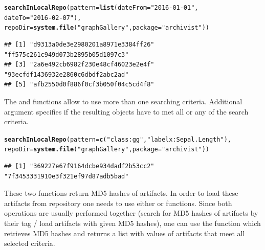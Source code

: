 \documentclass[nojss]{jss}\usepackage[]{graphicx}\usepackage[]{color}
\makeatletter
\newcommand{\hlstr}[1]{\textcolor[rgb]{0.192,0.494,0.8}{#1}}%
\newcommand{\hlstd}[1]{\textcolor[rgb]{0.345,0.345,0.345}{#1}}%
\newcommand{\hlkwc}[1]{\textcolor[rgb]{0.333,0.667,0.333}{#1}}%
\newcommand{\hlkwd}[1]{\textcolor[rgb]{0.737,0.353,0.396}{\textbf{#1}}}%
\newenvironment{kframe}{%
 \def\at@end@of@kframe{}%
 \ifinner\ifhmode%
  \def\at@end@of@kframe{\end{minipage}}%
  \begin{minipage}{\columnwidth}%
 \fi\fi%
 \def\FrameCommand##1{\hskip\@totalleftmargin \hskip-\fboxsep
 \colorbox{shadecolor}{##1}\hskip-\fboxsep
     \hskip-\linewidth \hskip-\@totalleftmargin \hskip\columnwidth}%
 \MakeFramed {\advance\hsize-\width
   \@totalleftmargin\z@ \linewidth\hsize
   \@setminipage}}%
 {\par\unskip\endMakeFramed%
 \at@end@of@kframe}
\newenvironment{knitrout}{}{} %
\makeatother
\begin{document}
\begin{knitrout}
\color{fgcolor}\begin{kframe}
\begin{alltt}
\hlkwd{searchInLocalRepo}\hlstd{(}\hlkwc{pattern} \hlstd{=} \hlkwd{list}\hlstd{(}\hlkwc{dateFrom} \hlstd{=} \hlstr{"2016-01-01"}\hlstd{,}
    \hlkwc{dateTo} \hlstd{=} \hlstr{"2016-02-07"}\hlstd{),}
    \hlkwc{repoDir} \hlstd{=} \hlkwd{system.file}\hlstd{(}\hlstr{"graphGallery"}\hlstd{,} \hlkwc{package} \hlstd{=} \hlstr{"archivist"}\hlstd{))}
\end{alltt}
\begin{verbatim}
## [1] "d9313a0de3e2980201a8971e3384ff26" "ff575c261c949d073b2895b05d1097c3"
## [3] "2a6e492cb6982f230e48cf46023e2e4f" "93ecfdf1436932e2860c6dbdf2abc2ad"
## [5] "afb2550d0f886f0cf3b050f04c5cd4f8"
\end{verbatim}
\end{kframe}
\end{knitrout}

The  and  functions allow to use more than one searching criteria. Additional argument  specifies if the resulting objects have to met all or any of the search criteria.

\begin{knitrout}
\color{fgcolor}\begin{kframe}
\begin{alltt}
\hlkwd{searchInLocalRepo}\hlstd{(}\hlkwc{pattern}\hlstd{=}\hlkwd{c}\hlstd{(}\hlstr{"class:gg"}\hlstd{,} \hlstr{"labelx:Sepal.Length"}\hlstd{),}
    \hlkwc{repoDir} \hlstd{=} \hlkwd{system.file}\hlstd{(}\hlstr{"graphGallery"}\hlstd{,} \hlkwc{package} \hlstd{=} \hlstr{"archivist"}\hlstd{))}
\end{alltt}
\begin{verbatim}
## [1] "369227e67f9164dcbe934dadf2b53cc2" "7f3453331910e3f321ef97d87adb5bad"
\end{verbatim}
\end{kframe}
\end{knitrout}

These two functions return MD5 hashes of artifacts. In order to load these artifacts from repository one needs to use either  or  functions.
Since both operations are usually performed together (search for MD5 hashes of artifacts by their tag / load artifacts with given MD5 hashes), one can use the  function which retrieves MD5 hashes and returns a list with values of artifacts that meet all selected criteria.
\end{document}

